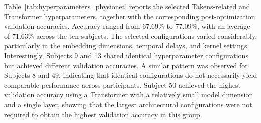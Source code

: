\begin{table}[htbp]
\centering
\caption{Subject-specific CTE-Net hyperparameters selected through Bayesian optimization on the \gls{eegmmidb} dataset, including Takens embedding and Transformer configurations.}
\label{tab:hyperparameters_physionet}

\end{table}


Table~\ref{tab:hyperparameters_physionet} reports the selected Takens-related and Transformer hyperparameters, together with the corresponding post-optimization validation accuracies. Accuracy ranged from 67.69\% to 77.09\%, with an average of 71.63\% across the ten subjects. The selected configurations varied considerably, particularly in the embedding dimensions, temporal delays, and kernel settings. Interestingly, Subjects 9 and 13 shared identical hyperparameter configurations but achieved different validation accuracies. A similar pattern was observed for Subjects 8 and 49, indicating that identical configurations do not necessarily yield comparable performance across participants. Subject 50 achieved the highest validation accuracy using a Transformer with a relatively small model dimension and a single layer, showing that the largest architectural configurations were not required to obtain the highest validation accuracy in this group.

